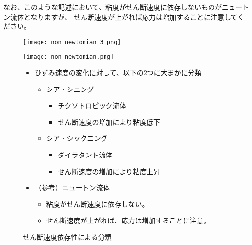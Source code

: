 \documentclass[uplatex,dvipdfmx,a4paper,11pt]{jsarticle}
\begin{document}
なお、このような記述において、粘度がせん断速度に依存しないものがニュートン流体となりますが、
せん断速度が上がれば応力は増加することに注意してください。
\begin{figure}[htb]
	\begin{center}
		\begin{minipage}{0.45\textwidth}
			\begin{center}
			\texttt{[image: non\_newtonian\_3.png]}

			\vspace{20pt}

			\texttt{[image: non\_newtonian.png]}
			\end{center}
		\end{minipage}
		\begin{minipage}{0.45\textwidth}
			\begin{itemize}
				\item ひずみ速度の変化に対して、以下の2つに大まかに分類
				\begin{itemize}
					\item シア・シニング
					\begin{itemize}
						\item チクソトロピック流体
						\item せん断速度の増加により粘度低下
					\end{itemize}
					\item シア・シックニング
					\begin{itemize}
						\item ダイラタント流体
						\item せん断速度の増加により粘度上昇
					\end{itemize}
				\end{itemize}
				\item （参考）ニュートン流体
					\begin{itemize}
						\item 粘度がせん断速度に依存しない。
						\item せん断速度が上がれば、応力は増加することに注意。
					\end{itemize}
			\end{itemize}
		\end{minipage}
		\caption{せん断速度依存性による分類}
		\label{fig:shearrate_dep}
	\end{center}
\end{figure}
\end{document}

